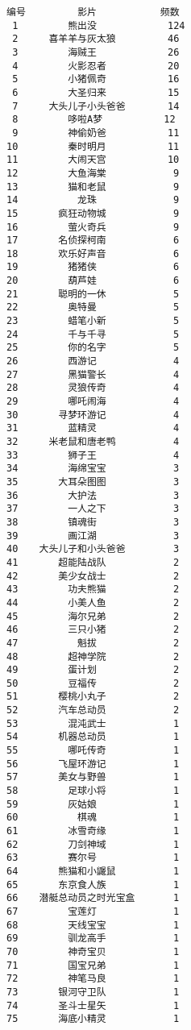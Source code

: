 \documentclass[11pt]{article}
\begin{document}
    \begin{Verbatim}[commandchars=\\\{\}]
编号 	       影片       	频数 
 1 	　　　　熊出没　　　　　	124
 2 	　　喜羊羊与灰太狼　　　	46 
 3 	　　　　海贼王　　　　　	26 
 4 	　　　　火影忍者　　　　	20 
 5 	　　　　小猪佩奇　　　　	16 
 6 	　　　　大圣归来　　　　	15 
 7 	　　大头儿子小头爸爸　　	14 
 8 	　　　　哆啦A梦　　　　	12 
 9 	　　　　神偷奶爸　　　　	11 
10 	　　　　秦时明月　　　　	11 
11 	　　　　大闹天宫　　　　	10 
12 	　　　　大鱼海棠　　　　	 9 
13 	　　　　猫和老鼠　　　　	 9 
14 	　　　　　龙珠　　　　　	 9 
15 	　　　疯狂动物城　　　　	 9 
16 	　　　　萤火奇兵　　　　	 9 
17 	　　　名侦探柯南　　　　	 6 
18 	　　　欢乐好声音　　　　	 6 
19 	　　　　猪猪侠　　　　　	 6 
20 	　　　　葫芦娃　　　　　	 6 
21 	　　　聪明的一休　　　　	 5 
22 	　　　　奥特曼　　　　　	 5 
23 	　　　　蜡笔小新　　　　	 5 
24 	　　　　千与千寻　　　　	 5 
25 	　　　　你的名字　　　　	 5 
26 	　　　　西游记　　　　　	 4 
27 	　　　　黑猫警长　　　　	 4 
28 	　　　　灵狼传奇　　　　	 4 
29 	　　　　哪吒闹海　　　　	 4 
30 	　　　寻梦环游记　　　　	 4 
31 	　　　　蓝精灵　　　　　	 4 
32 	　　米老鼠和唐老鸭　　　	 4 
33 	　　　　狮子王　　　　　	 4 
34 	　　　　海绵宝宝　　　　	 3 
35 	　　　大耳朵图图　　　　	 3 
36 	　　　　大护法　　　　　	 3 
37 	　　　　一人之下　　　　	 3 
38 	　　　　镇魂街　　　　　	 3 
39 	　　　　画江湖　　　　　	 3 
40 	　大头儿子和小头爸爸　　	 3 
41 	　　　超能陆战队　　　　	 2 
42 	　　　美少女战士　　　　	 2 
43 	　　　　功夫熊猫　　　　	 2 
44 	　　　　小美人鱼　　　　	 2 
45 	　　　　海尔兄弟　　　　	 2 
46 	　　　　三只小猪　　　　	 2 
47 	　　　　　魁拔　　　　　	 2 
48 	　　　　超神学院　　　　	 2 
49 	　　　　蛋计划　　　　　	 2 
50 	　　　　豆福传　　　　　	 2 
51 	　　　樱桃小丸子　　　　	 2 
52 	　　　汽车总动员　　　　	 2 
53 	　　　　混沌武士　　　　	 1 
54 	　　　机器总动员　　　　	 1 
55 	　　　　哪吒传奇　　　　	 1 
56 	　　　飞屋环游记　　　　	 1 
57 	　　　美女与野兽　　　　	 1 
58 	　　　　足球小将　　　　	 1 
59 	　　　　灰姑娘　　　　　	 1 
60 	　　　　　棋魂　　　　　	 1 
61 	　　　　冰雪奇缘　　　　	 1 
62 	　　　　刀剑神域　　　　	 1 
63 	　　　　赛尔号　　　　　	 1 
64 	　　　熊猫和小鼹鼠　　　	 1 
65 	　　　东京食人族　　　　	 1 
66 	　潜艇总动员之时光宝盒　	 1 
67 	　　　　宝莲灯　　　　　	 1 
68 	　　　　天线宝宝　　　　	 1 
69 	　　　　驯龙高手　　　　	 1 
70 	　　　　神奇宝贝　　　　	 1 
71 	　　　　国宝兄弟　　　　	 1 
72 	　　　　神笔马良　　　　	 1 
73 	　　　银河守卫队　　　　	 1 
74 	　　　圣斗士星矢　　　　	 1 
75 	　　　海底小精灵　　　　	 1 

\end{Verbatim}
\end{document}
